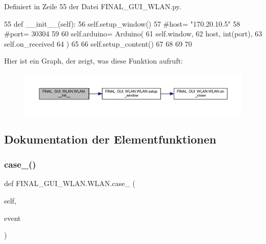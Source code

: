 Definiert in Zeile 55 der Datei F\+I\+N\+A\+L\+\_\+\+G\+U\+I\+\_\+\+W\+L\+A\+N.\+py.


\begin{DoxyCode}
55     \textcolor{keyword}{def }\_\_init\_\_(self):
56         self.setup\_window()
57         \textcolor{comment}{#host= "170.20.10.5"}
58         \textcolor{comment}{#port= 30304}
59 
60         self.arduino= Arduino(
61             self.window,
62             host, int(port),
63             self.on\_received
64         )
65 
66         self.setup\_content()
67 
68     
69     
70     
\end{DoxyCode}
Hier ist ein Graph, der zeigt, was diese Funktion aufruft\+:\nopagebreak
\begin{figure}[H]
\begin{center}
\leavevmode
\includegraphics[width=350pt]{class_f_i_n_a_l___g_u_i___w_l_a_n_1_1_w_l_a_n_abd0bb3e25ffdc1d77064fdbe4fae547c_cgraph}
\end{center}
\end{figure}


\subsection{Dokumentation der Elementfunktionen}
\mbox{\label{class_f_i_n_a_l___g_u_i___w_l_a_n_1_1_w_l_a_n_aa39317ec4b35d7765ffbbefa3a341935}} 
\subsubsection{\texorpdfstring{case\+\_()}{case\_1()}}
{\footnotesize\ttfamily def F\+I\+N\+A\+L\+\_\+\+G\+U\+I\+\_\+\+W\+L\+A\+N.\+W\+L\+A\+N.\+case\+\_ (\begin{DoxyParamCaption}\item[{}]{self,  }\item[{}]{event }\end{DoxyParamCaption})}



